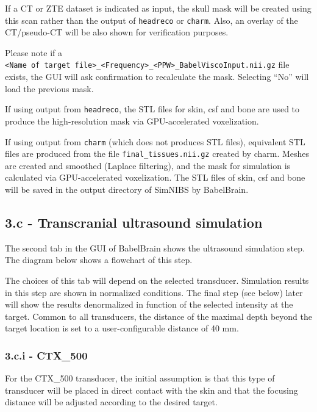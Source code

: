 If a CT or ZTE dataset is indicated as input, the skull mask will be
created using this scan rather than the output of \texttt{headreco} or
\texttt{charm}. Also, an overlay of the CT/pseudo-CT will be also shown
for verification purposes.

Please note if a
\texttt{\textless{}Name\ of\ target\ file\textgreater{}\_\textless{}Frequency\textgreater{}\_\textless{}PPW\textgreater{}\_BabelViscoInput.nii.gz}
file exists, the GUI will ask confirmation to recalculate the mask.
Selecting ``No'' will load the previous mask.

If using output from \texttt{headreco}, the STL files for skin, csf and
bone are used to produce the high-resolution mask via GPU-accelerated
voxelization.

If using output from \texttt{charm} (which does not produces STL files),
equivalent STL files are produced from the file
\texttt{final\_tissues.nii.gz} created by charm. Meshes are created and
smoothed (Laplace filtering), and the mask for simulation is calculated
via GPU-accelerated voxelization. The STL files of skin, csf and bone
will be saved in the output directory of SimNIBS by BabelBrain.

\hypertarget{c---transcranial-ultrasound-simulation}{%
\subsection{3.c - Transcranial ultrasound
simulation}\label{c---transcranial-ultrasound-simulation}}

The second tab in the GUI of BabelBrain shows the ultrasound simulation
step. The diagram below shows a flowchart of this step.

The choices of this tab will depend on the selected transducer.
Simulation results in this step are shown in normalized conditions. The
final step (see below) later will show the results denormalized in
function of the selected intensity at the target. Common to all
transducers, the distance of the maximal depth beyond the target
location is set to a user-configurable distance of 40 mm.

\hypertarget{c.i---ctx_500}{%
\subsubsection{3.c.i - CTX\_500}\label{c.i---ctx_500}}

For the CTX\_500 transducer, the initial assumption is that this type of
transducer will be placed in direct contact with the skin and that the
focusing distance will be adjusted according to the desired target.


